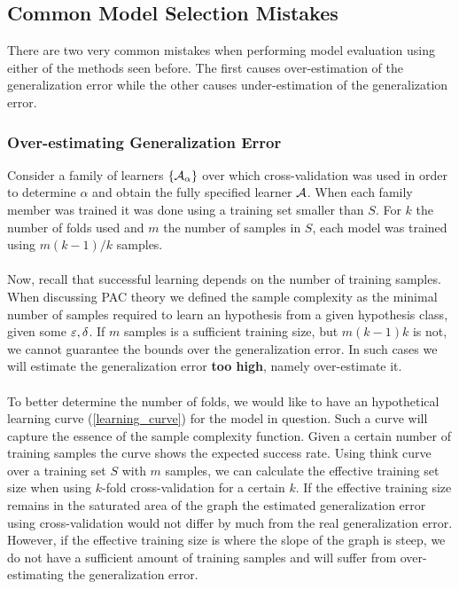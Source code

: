 \subsection{Common Model Selection Mistakes}
There are two very common mistakes when performing model evaluation using either of the methods seen before. The first causes over-estimation of the generalization error while the other causes under-estimation of the generalization error.
\subsubsection{Over-estimating Generalization Error}
Consider a family of learners $\left\{\mathcal{A}_\alpha\right\}$ over which cross-validation was used in order to determine $\alpha$ and obtain the fully specified learner $\mathcal{A}$. When each family member was trained it was done using a training set smaller than $S$. For $k$ the number of folds used and $m$ the number of samples in $S$, each model was trained using $m\left(k-1\right)/k$ samples.
\\~\\
Now, recall that successful learning depends on the number of training samples. When discussing PAC theory we defined the sample complexity as the minimal number of samples required to learn an hypothesis from a given hypothesis class, given some $\varepsilon,\delta$. If $m$ samples is a sufficient training size, but $m\left(k-1\right)k$ is not, we cannot guarantee the bounds over the generalization error. In such cases we will estimate the generalization error \textbf{too high}, namely over-estimate it.
\\~\\
To better determine the number of folds, we would like to have an hypothetical learning curve (\autoref{learning_curve}) for the model in question. Such a curve will capture the essence of the sample complexity function. Given a certain number of training samples the curve shows the expected success rate. Using think curve over a training set $S$ with $m$ samples, we can calculate the effective training set size when using $k$-fold cross-validation for a certain $k$. If the effective training size remains in the saturated area of the graph the estimated generalization error using cross-validation would not differ by much from the real generalization error. However, if the effective training size is where the slope of the graph is steep, we do not have a sufficient amount of training samples and will suffer from over-estimating the generalization error.


